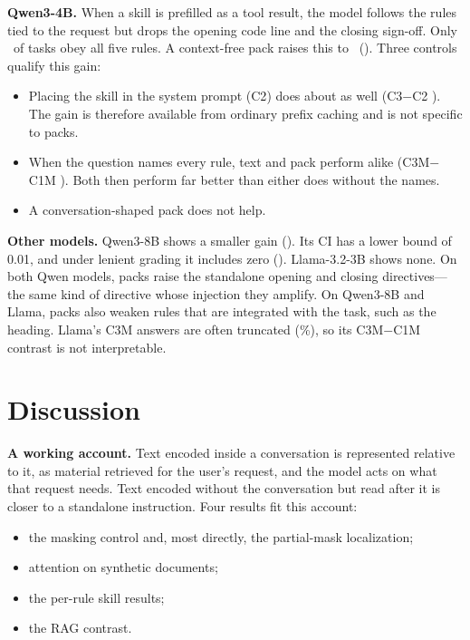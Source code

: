 \documentclass[10pt]{article}
\newcommand{\cond}[1]{\textsf{#1}}
\begin{document}
\textbf{Qwen3-4B.} When a skill is prefilled as a tool result, the model follows the rules tied to the request but drops the opening
code line and the closing sign-off. Only \WtwoFourCone\ of tasks obey all five rules. A context-free pack raises this to
\WtwoFourCthree\ (\WtwoFourDthree). Three controls qualify this gain:
\begin{itemize}
\item Placing the skill in the system prompt (\cond{C2}) does about as well (\cond{C3}$-$\cond{C2} \WtwoFourDthreeTwo). The gain is
  therefore available from ordinary prefix caching and is not specific to packs.
\item When the question names every rule, text and pack perform alike (\cond{C3M}$-$\cond{C1M} \WtwoFourDMM). Both then perform
  far better than either does without the names.
\item A conversation-shaped pack does not help.
\end{itemize}

\textbf{Other models.} Qwen3-8B shows a smaller gain (\WtwoEightDthree). Its CI has a lower bound of 0.01, and under lenient grading it
includes zero (\WtwoEightDLenient). Llama-3.2-3B shows none. On both Qwen models, packs raise the standalone opening and closing
directives---the same kind of directive whose injection they amplify. On Qwen3-8B and Llama, packs also weaken rules that are
integrated with the task, such as the heading. Llama's \cond{C3M} answers are often truncated (\WtwoLlamaTruncCthreeM\%), so its
\cond{C3M}$-$\cond{C1M} contrast is not interpretable.

\section{Discussion}\label{sec:discussion}
\textbf{A working account.} Text encoded inside a conversation is represented relative to it, as material retrieved for the user's
request, and the model acts on what that request needs. Text encoded without the conversation but read after it is closer to a
standalone instruction. Four results fit this account:
\begin{itemize}
\item the masking control and, most directly, the partial-mask localization;
\item attention on synthetic documents;
\item the per-rule skill results;
\item the RAG contrast.
\end{itemize}
\end{document}
